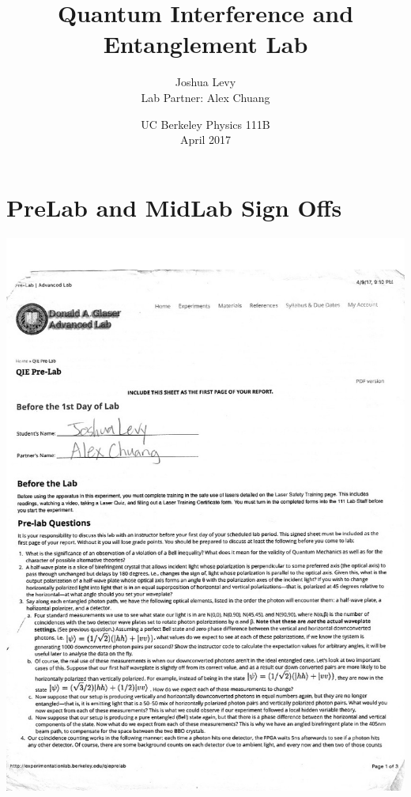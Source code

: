 \documentclass{article}
\title{Quantum Interference and Entanglement Lab}
\author{Joshua Levy\\Lab Partner: Alex Chuang}
\date{UC Berkeley Physics 111B\\April 2017}
\begin{document}
\maketitle

\section{PreLab and MidLab Sign Offs}
\begin{center}
\includegraphics[scale = 0.3]{PreLab1.jpeg}

\end{center}
\end{document}
